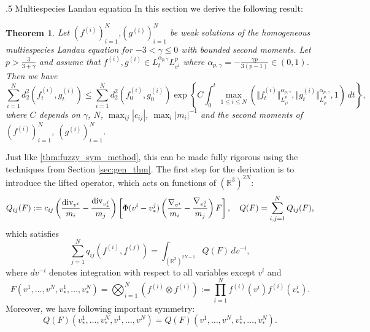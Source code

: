 \documentclass[10pt,oneside]{amsart}
\makeatletter
\def\subsection{\@startsection{subsection}{2}%
  \z@{.5\linespacing\@plus.7\linespacing}
{.5\baselineskip}%
  {\normalfont\centering\scshape}%
}
\numberwithin{equation}{section}
\numberwithin{definition}{section}
\newtheorem{theorem}{Theorem}
\numberwithin{theorem}{section}
\numberwithin{lemma}{section}
\makeatother
\begin{document}
\subsection{Multiespecies Landau equation}\label{subsec:sym_multi}
In this section we derive the following result:
% 
\begin{theorem}\label{thm:multi_sym_method}
  Let $(f^{(i)})_{i=1}^N$,$(g^{(i)})_{i=1}^N$ be weak solutions of the homogeneous multiespecies Landau equation for $-3<\gamma \leq 0$ with bounded second moments. Let $p>\frac{3}{3+\gamma}$ and assume that ${f^{(i)},g^{(i)}\in L^{\alpha_{p,\gamma}}_tL^p_{v^i}}$ where $\alpha_{p,\gamma}=-\frac{\gamma p}{3(p-1)}\in (0,1)$. Then we have
  \begin{equation*}
    \sum_{i=1}^{N}d_{2}^{2}(f_{t}^{(i)},g_{t}^{(i)})\leq\sum_{i=1}^{N}d_{2}^{2}(f_{0}^{(i)},g_{0}^{(i)})\exp\left\{ C\int_{0}^{t}\max_{1\leq i\leq N}(\Vert f_{t}^{(i)}\Vert_{L_{v^{i}}^{p}}^{\alpha_{p,\gamma}},\Vert g_{t}^{(i)}\Vert_{L_{v^{i}}^{p}}^{\alpha_{p,\gamma}},1)\,dt\right\},
  \end{equation*}
  where $C$ depends on $\gamma$, $N$, $\max_{ij}|c_{ij}|$, $\max_{i}|m_{i}|^{-1}$ and the second moments of $(f^{(i)})_{i=1}^{N}$, $(g^{(i)})_{i=1}^{N}$.
\end{theorem}
% 
Just like \cref{thm:fuzzy_sym_method}, this can be made fully rigorous using the techniques from Section \ref{sec:gen_thm}. The first step for the derivation is to introduce the lifted operator, which acts on functions of $(\mathbb R^3)^{2N}$:
%
\begin{equation*}
  Q_{ij}(F):=c_{ij}\left(\frac{\textnormal{div}_{v^{i}}}{m_{i}}-\frac{\textnormal{div}_{v^{j}_*}}{m_{j}}\right)\left[\Phi(v^{i}-v^{j}_*)\left(\frac{\nabla_{v^{i}}}{m_{i}}-\frac{\nabla_{v^{j}_*}}{m_{j}}\right)F\right]
  ,\quad Q(F)=\sum_{i,j = 1}^NQ_{ij}(F),
\end{equation*}
%
which satisfies
%
\begin{equation*}
  \sum_{j=1}^{N}q_{ij}(f^{(i)},f^{(j)})=\int_{\left(\mathbb{R}^{3}\right)^{2N-1}}Q(F)\,dv^{-i},
\end{equation*}
%
where $dv^{-i}$ denotes integration with respect to all variables except $v^i$ and
%
\begin{equation*}
  F(v^{1},\ldots,v^{N},v_*^{1},\ldots,v_*^{N})=\bigotimes_{i=1}^N(f^{(i)}\otimes f^{(i)}):=\prod_{i=1}^{N}f^{(i)}(v^{i})f^{(i)}(v_*^{i}).
\end{equation*}
%
Moreover, we have following important symmetry:
%
\begin{equation}\label{eq:sym_Q_multi}
  Q(F)(v_*^{1},\ldots,v_*^{N},v^{1},\ldots,v^{N})=Q(F)(v^{1},\ldots,v^{N},v_*^{1},\ldots,v_*^{N}).
\end{equation}
\end{document}
